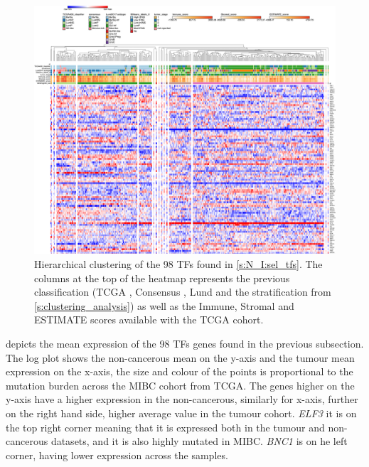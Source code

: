 \begin{figure}[H]   
\centering
\includegraphics[width=1.0\textwidth,height=1.0\textheight,keepaspectratio]{Sections/Network_I/Resources/selective_pruning/15_CS_norm_sel_tfs.png}
  \caption{Hierarchical clustering of the 98 TFs found in \cref{s:N_I:sel_tfs}. The columns at the top of the heatmap represents the previous classification (TCGA \cite{Robertson2017-mg}, Consensus \cite{Kamoun2020-tj}, Lund \cite{Marzouka2018-ge} and the stratification from \cref{s:clustering_analysis}) as well as the Immune, Stromal and ESTIMATE scores available with the TCGA cohort.}
\label{fig:ap:morph_sel_tfs}
\end{figure}

 depicts the mean expression of the 98 TFs genes found in the previous subsection. The log plot shows the non-cancerous mean on the y-axis and the tumour mean expression on the x-axis, the size and colour of the points is proportional to the mutation burden across the MIBC cohort from TCGA. The genes higher on the y-axis have a higher expression in the non-cancerous, similarly for x-axis, further on the right hand side, higher average value in the tumour cohort. \textit{ELF3} it is on the top right corner meaning that it is expressed both in the tumour and non-cancerous datasets, and it is also highly mutated in MIBC. \textit{BNC1} is on he left corner, having lower expression across the samples.

